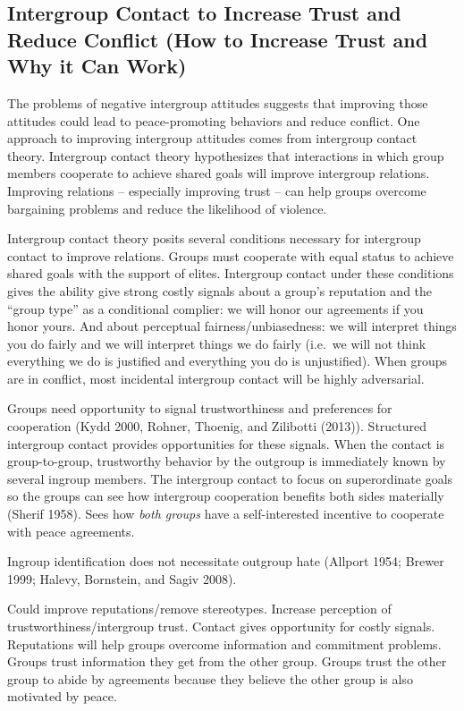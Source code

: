 \documentclass[11pt]{article}
\begin{document}
\subsection{Intergroup Contact to Increase Trust and Reduce Conflict
(How to Increase Trust and Why it Can
Work)}\label{intergroup-contact-to-increase-trust-and-reduce-conflict-how-to-increase-trust-and-why-it-can-work}

The problems of negative intergroup attitudes suggests that improving
those attitudes could lead to peace-promoting behaviors and reduce
conflict. One approach to improving intergroup attitudes comes from
intergroup contact theory. Intergroup contact theory hypothesizes that
interactions in which group members cooperate to achieve shared goals
will improve intergroup relations. Improving relations -- especially
improving trust -- can help groups overcome bargaining problems and
reduce the likelihood of violence.

Intergroup contact theory posits several conditions necessary for
intergroup contact to improve relations. Groups must cooperate with
equal status to achieve shared goals with the support of elites.
Intergroup contact under these conditions gives the ability give strong
costly signals about a group's reputation and the ``group type'' as a
conditional complier: we will honor our agreements if you honor yours.
And about perceptual fairness/unbiasedness: we will interpret things you
do fairly and we will interpret things we do fairly (i.e.~we will not
think everything we do is justified and everything you do is
unjustified). When groups are in conflict, most incidental intergroup
contact will be highly adversarial.

Groups need opportunity to signal trustworthiness and preferences for
cooperation (Kydd 2000, Rohner, Thoenig, and Zilibotti (2013)).
Structured intergroup contact provides opportunities for these signals.
When the contact is group-to-group, trustworthy behavior by the outgroup
is immediately known by several ingroup members. The intergroup contact
to focus on superordinate goals so the groups can see how intergroup
cooperation benefits both sides materially (Sherif 1958). Sees how
\emph{both groups} have a self-interested incentive to cooperate with
peace agreements.

Ingroup identification does not necessitate outgroup hate (Allport 1954;
Brewer 1999; Halevy, Bornstein, and Sagiv 2008).

Could improve reputations/remove stereotypes. Increase perception of
trustworthiness/intergroup trust. Contact gives opportunity for costly
signals. Reputations will help groups overcome information and
commitment problems. Groups trust information they get from the other
group. Groups trust the other group to abide by agreements because they
believe the other group is also motivated by peace.
\end{document}
